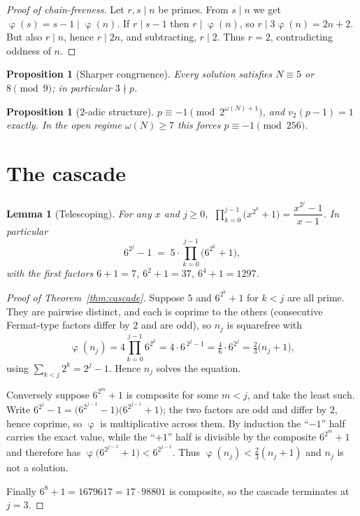 \documentclass[11pt,reqno]{amsart}
\theoremstyle{plain}
\newtheorem{proposition}[theorem]{Proposition}
\newtheorem{lemma}[theorem]{Lemma}
\theoremstyle{definition}
\DeclareMathOperator{\tot}{\varphi}
\begin{document}
\begin{proof}[Proof of chain-freeness]
Let $r,s\mid n$ be primes. From $s\mid n$ we get $\tot(s)=s-1\mid\tot(n)$. If $r\mid s-1$ then
$r\mid\tot(n)$, so $r\mid 3\tot(n)=2n+2$. But also $r\mid n$, hence $r\mid 2n$, and
subtracting, $r\mid2$. Thus $r=2$, contradicting oddness of $n$.
\end{proof}

\begin{proposition}[Sharper congruence]\label{prop:mod9}
Every solution satisfies $N\equiv5$ or $8\pmod 9$; in particular $3\nmid p$.
\end{proposition}

\begin{proposition}[$2$-adic structure]\label{prop:2adic}
$p\equiv-1 \pmod{2^{\omega(N)+1}}$, and $v_2(p-1)=1$ exactly. In the open regime
$\omega(N)\ge7$ this forces $p\equiv-1\pmod{256}$.
\end{proposition}

\section{The cascade}\label{sec:cascade}

\begin{lemma}[Telescoping]\label{lem:tele}
For any $x$ and $j\ge0$, $\ \prod_{k=0}^{j-1}\big(x^{2^k}+1\big)=\dfrac{x^{2^j}-1}{x-1}$.
In particular
\[
  6^{2^j}-1 \;=\; 5\cdot\prod_{k=0}^{j-1}\big(6^{2^k}+1\big),
\]
with the first factors $6+1=7$, $6^2+1=37$, $6^4+1=1297$.
\end{lemma}

\begin{proof}[Proof of Theorem~\ref{thm:cascade}]
Suppose $5$ and $6^{2^k}+1$ for $k<j$ are all prime. They are pairwise distinct, and each is
coprime to the others (consecutive Fermat-type factors differ by $2$ and are odd), so $n_j$ is
squarefree with
\[
  \tot(n_j)=4\prod_{k=0}^{j-1}6^{2^k}
  =4\cdot 6^{\,2^j-1}
  =\tfrac{4}{6}\cdot 6^{2^j}
  =\tfrac23\big(n_j+1\big),
\]
using $\sum_{k<j}2^k=2^j-1$. Hence $n_j$ solves the equation.

Conversely suppose $6^{2^m}+1$ is composite for some $m<j$, and take the least such. Write
$6^{2^j}-1=\big(6^{2^{j-1}}-1\big)\big(6^{2^{j-1}}+1\big)$; the two factors are odd and differ
by $2$, hence coprime, so $\tot$ is multiplicative across them. By induction the ``$-1$'' half
carries the exact value, while the ``$+1$'' half is divisible by the composite $6^{2^m}+1$ and
therefore has $\tot\big(6^{2^{j-1}}+1\big)<6^{2^{j-1}}$. Thus
$\tot(n_j)<\tfrac23(n_j+1)$ and $n_j$ is not a solution.

Finally $6^8+1=1679617=17\cdot98801$ is composite, so the cascade terminates at $j=3$.
\end{proof}
\end{document}
